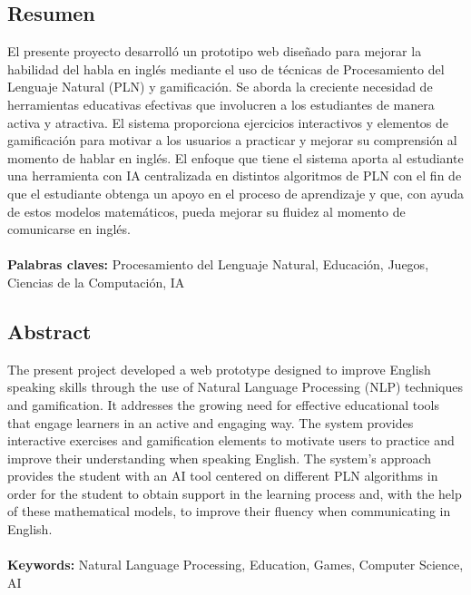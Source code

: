 \begin{center}
	\section*{Resumen}	
\end{center}

El presente proyecto desarrolló un prototipo web diseñado para mejorar la habilidad del habla en inglés mediante el uso de técnicas de Procesamiento del Lenguaje Natural (PLN) y gamificación. Se aborda la creciente necesidad de herramientas educativas efectivas que involucren a los estudiantes de manera activa y atractiva. El sistema proporciona ejercicios interactivos y elementos de gamificación para motivar a los usuarios a practicar y mejorar su comprensión al momento de hablar en inglés. El enfoque que tiene el sistema aporta al estudiante una herramienta con IA centralizada en distintos algoritmos de PLN con el fin de que el estudiante obtenga un apoyo en el proceso de aprendizaje y que, con ayuda de estos modelos matemáticos, pueda mejorar su fluidez al momento de comunicarse en inglés.
\\
\\
 \textbf{Palabras claves:}
Procesamiento del Lenguaje Natural, Educación, Juegos, Ciencias de la Computación, IA

\newpage
\begin{center}
	\section*{Abstract}
\end{center}

The present project developed a web prototype designed to improve English speaking skills through the use of Natural Language Processing (NLP) techniques and gamification. It addresses the growing need for effective educational tools that engage learners in an active and engaging way. The system provides interactive exercises and gamification elements to motivate users to practice and improve their understanding when speaking English. The system's approach provides the student with an AI tool centered on different PLN algorithms in order for the student to obtain support in the learning process and, with the help of these mathematical models, to improve their fluency when communicating in English.
\\
\\
 \textbf{Keywords:}
Natural Language Processing, Education, Games, Computer Science, AI
 

 